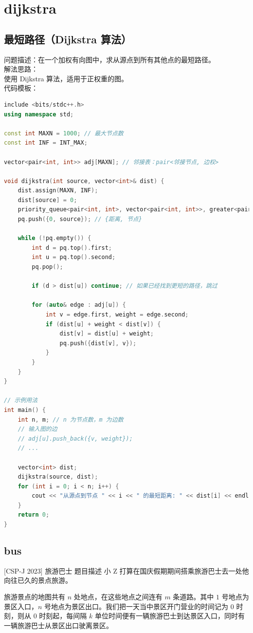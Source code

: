 \documentclass[12pt,twiside,a4paper]{ctexbook}
\numberwithin{chapter}{part}
\begin{document}
\chapter{dijkstra}
\section{最短路径（Dijkstra 算法）}
问题描述：在一个加权有向图中，求从源点到所有其他点的最短路径。\\
解法思路：\\
使用 Dijkstra 算法，适用于正权重的图。\\
代码模板：
\begin{lstlisting}[language=C++]
include <bits/stdc++.h>
using namespace std;

const int MAXN = 1000; // 最大节点数
const int INF = INT_MAX;

vector<pair<int, int>> adj[MAXN]; // 邻接表：pair<邻接节点, 边权>

void dijkstra(int source, vector<int>& dist) {
    dist.assign(MAXN, INF);
    dist[source] = 0;
    priority_queue<pair<int, int>, vector<pair<int, int>>, greater<pair<int, int>>> pq;
    pq.push({0, source}); // {距离, 节点}

    while (!pq.empty()) {
        int d = pq.top().first;
        int u = pq.top().second;
        pq.pop();

        if (d > dist[u]) continue; // 如果已经找到更短的路径，跳过

        for (auto& edge : adj[u]) {
            int v = edge.first, weight = edge.second;
            if (dist[u] + weight < dist[v]) {
                dist[v] = dist[u] + weight;
                pq.push({dist[v], v});
            }
        }
    }
}

// 示例用法
int main() {
    int n, m; // n 为节点数，m 为边数
    // 输入图的边
    // adj[u].push_back({v, weight});
    // ...
    
    vector<int> dist;
    dijkstra(source, dist);
    for (int i = 0; i < n; i++) {
        cout << "从源点到节点 " << i << " 的最短距离: " << dist[i] << endl;
    }
    return 0;
}
\end{lstlisting}

\section{bus}
 [CSP-J 2023] 旅游巴士
 题目描述
小 Z 打算在国庆假期期间搭乘旅游巴士去一处他向往已久的景点旅游。

旅游景点的地图共有 $n$ 处地点，在这些地点之间连有 $m$ 条道路。其中 $1$ 号地点为景区入口，$n$ 号地点为景区出口。我们把一天当中景区开门营业的时间记为 $0$ 时刻，则从 $0$ 时刻起，每间隔 $k$ 单位时间便有一辆旅游巴士到达景区入口，同时有一辆旅游巴士从景区出口驶离景区。
\end{document}
